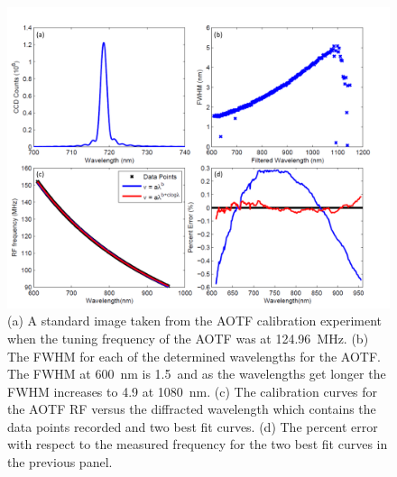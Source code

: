 \documentclass[12pt]{article}
\begin{document}
\newpage

\begin{figure}
    \begin{subfigure}[t]{0\textwidth}
        \label{fig:3.1:AOTFCharaterization:a}
    \end{subfigure}
    \begin{subfigure}[t]{0\textwidth}
         \label{fig:3.1:AOTFCharaterization:b}
    \end{subfigure}
    \begin{subfigure}[t]{0\textwidth}
         \label{fig:3.1:AOTFCharaterization:c}
    \end{subfigure}
    \begin{subfigure}[t]{0\textwidth}
         \label{fig:3.1:AOTFCharaterization:d}
    \end{subfigure}
    \includegraphics[width=1.0\textwidth]{./Images/3-1-AOTFCharaterization.pdf}
    \caption{(a) A standard image taken from the AOTF calibration experiment when the tuning frequency of the AOTF was at 124.96~MHz. (b) The FWHM for each of the determined wavelengths for the AOTF. The FWHM at 600~nm is 1.5~and as the wavelengths get longer the FWHM increases to 4.9 at 1080~nm. (c) The calibration curves for the AOTF RF versus the  diffracted wavelength which contains the data points recorded and two best fit curves. (d) The percent error with respect to the measured frequency for the two best fit curves in the previous panel.}
    \label{fig:3.1:AOTFCharaterization}
\end{figure}
\end{document}
